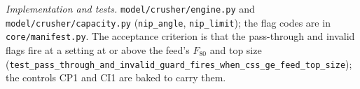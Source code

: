 \emph{Implementation and tests.} \texttt{model/\allowbreak{}crusher/\allowbreak{}engine.py} and \texttt{model/\allowbreak{}crusher/\allowbreak{}capacity.py} (\texttt{nip\_angle},
\texttt{nip\_limit}); the flag codes are in \texttt{core/\allowbreak{}manifest.py}. The acceptance criterion is that the pass-through and invalid
flags fire at a setting at or above the feed's $F_{80}$ and top size
(\texttt{test\_pass\_through\_and\_invalid\_guard\_fires\_when\_css\_ge\_feed\_top\_size}); the controls CP1 and CI1 are baked to carry
them.
